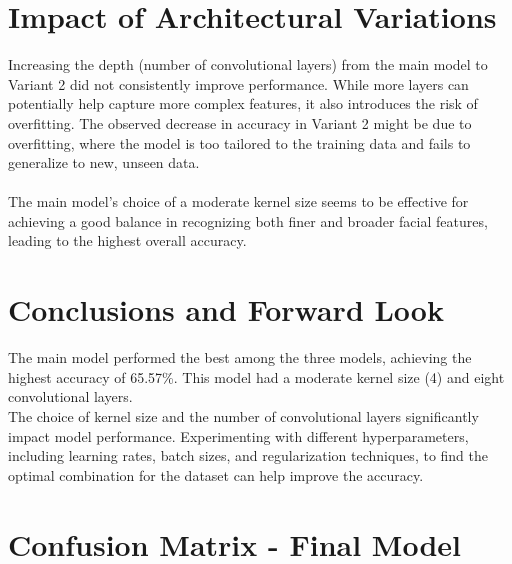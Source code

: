 \section{Impact of Architectural Variations}
\noindent Increasing the depth (number of convolutional layers) from the main model to Variant 2 did not consistently improve performance. While more layers can potentially help capture more complex features, it also introduces the risk of overfitting. The observed decrease in accuracy in Variant 2 might be due to overfitting, where the model is too tailored to the training data and fails to generalize to new, unseen data.\\\\
\noindent The main model's choice of a moderate kernel size seems to be effective for achieving a good balance in recognizing both finer and broader facial features, leading to the highest overall accuracy.

\section{Conclusions and Forward Look}
\noindent The main model performed the best among the three models, achieving the highest accuracy of 65.57\%. This model had a moderate kernel size (4) and eight convolutional layers.\\

\noindent The choice of kernel size and the number of convolutional layers significantly impact model performance.  Experimenting with different hyperparameters, including learning rates, batch sizes, and regularization techniques, to find the optimal combination for the dataset can help improve the accuracy.

\section {Confusion Matrix - Final Model}

